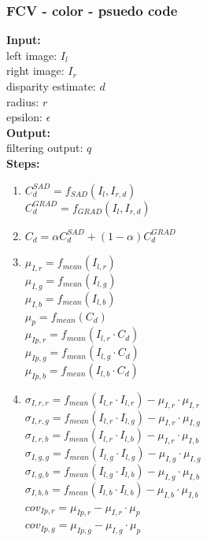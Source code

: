 \subsubsection*{FCV - color - psuedo code}
\textbf{Input:} \\
left image: $I_l$\\
right image: $I_r$\\
disparity estimate: $d$\\
radius: $r$\\
epsilon: $\epsilon$\\
\textbf{Output:} \\
filtering output: $q$\\
\textbf{Steps:}
\begin{enumerate}
  \item $C^{SAD}_d = f_{SAD}(I_l,I_{r,d})$\\
           $C^{GRAD}_d = f_{GRAD}(I_l,I_{r,d})$
  \item $C_d = \alpha C^{SAD}_d + (1-\alpha) C^{GRAD}_d$
  \item $\mu_{I,r} = f_{mean}(I_{l,r})$ \\
           $\mu_{I,g} = f_{mean}(I_{l,g})$ \\
           $\mu_{I,b} = f_{mean}(I_{l,b})$ \\
           $\mu_p = f_{mean}(C_d)$ \\
           $\mu_{Ip,r} = f_{mean}(I_{l,r}\cdot C_d)$ \\
           $\mu_{Ip,g} = f_{mean}(I_{l,g}\cdot C_d)$ \\
           $\mu_{Ip,b} = f_{mean}(I_{l,b}\cdot C_d)$
  \item $\sigma_{I,r,r} = f_{mean}(I_{l,r}\cdot I_{l,r}) - \mu_{I,r} \cdot \mu_{I,r}$\\
           $\sigma_{I,r,g} = f_{mean}(I_{l,r}\cdot I_{l,g}) - \mu_{I,r} \cdot \mu_{I,g}$\\
           $\sigma_{I,r,b} = f_{mean}(I_{l,r}\cdot I_{l,b}) - \mu_{I,r} \cdot \mu_{I,b}$\\
           $\sigma_{I,g,g} = f_{mean}(I_{l,g}\cdot I_{l,g})  - \mu_{I,g} \cdot \mu_{I,g}$\\
           $\sigma_{I,g,b} = f_{mean}(I_{l,g}\cdot I_{l,b}) - \mu_{I,g} \cdot \mu_{I,b}$\\
           $\sigma_{I,b,b} = f_{mean}(I_{l,b}\cdot I_{l,b}) - \mu_{I,b} \cdot \mu_{I,b}$\\
           $cov_{Ip,r} = \mu_{Ip,r} - \mu_{I,r} \cdot \mu_p$\\
           $cov_{Ip,g} = \mu_{Ip,g} - \mu_{I,g} \cdot \mu_p$\\

\end{enumerate}
